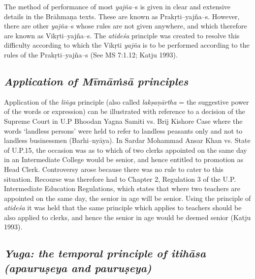 The method of performance of most \textit{yajña–}s is given in clear and extensive details in the Brāhmaṇa texts. These are known as Prakṛti–yajña–s. However, there are other \textit{yajña–}s whose rules are not given anywhere, and which therefore are known as Vikṛti–yajña–s. The \textit{atideśa} principle was created to resolve this difficulty according to which the Vikṛti \textit{yajña} is to be performed according to the rules of the Prakṛti–yajña–s (See MS 7:1.12; Katju 1993).


\subsection*{\textit{Application of Mīmāṁsā principles}}

Application of the \textit{liṅga} principle (also called \textit{lakṣaṇārtha} = the suggestive power of the words or expression) can be illustrated with reference to a decision of the Supreme Court in U.P Bhoodan Yagna Samiti vs. Brij Kishore Case where the words ‘landless persons’ were held to refer to landless peasants only and not to landless businessmen (Barhi–nyāya). In Sardar Mohammad Ansar Khan vs. State of U.P.15, the occasion was as to which of two clerks appointed on the same day in an Intermediate College would be senior, and hence entitled to promotion as Head Clerk. Controversy arose because there was no rule to cater to this situation. Recourse was therefore had to Chapter 2, Regulation 3 of the U.P. Intermediate Education Regulations, which states that where two teachers are appointed on the same day, the senior in age will be senior. Using the principle of \textit{atideśa} it was held that the same principle which applies to teachers should be also applied to clerks, and hence the senior in age would be deemed senior (Katju 1993).


\subsection*{\textit{Yuga: the temporal principle of itihāsa (apauruṣeya and pauruṣeya)}}

